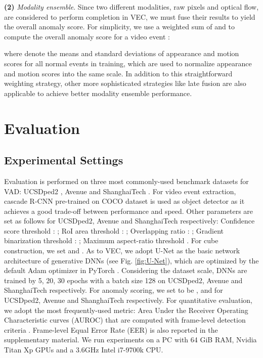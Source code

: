 \documentclass[sigconf]{acmart}
\begin{document}
\textbf{(2)} \textit{Modality ensemble}. Since two different modalities, raw pixels and optical flow, are considered to perform completion in VEC, we must fuse their results to yield the overall anomaly score. For simplicity, we use a weighted sum of  and  to compute the overall anomaly score  for a video event :


where  denote the means and standard deviations of appearance and motion scores for all normal events in training, which are used to normalize appearance and motion scores into the same scale. In addition to this straightforward weighting strategy, other more sophisticated strategies like late fusion \cite{xu2017detecting} are also applicable to achieve better modality ensemble performance.

\section{Evaluation}
\label{sec:eval}

\subsection{Experimental Settings}
Evaluation is performed on three most commonly-used benchmark datasets for VAD: UCSDped2 \cite{mahadevan2010anomaly}, Avenue \cite{lu2013abnormal} and ShanghaiTech \cite{luo2017revisit}. For video event extraction, cascade R-CNN \cite{cai2018cascade} pre-trained on COCO dataset is used as object detector as it achieves a good trade-off between performance and speed. Other parameters are set as follows for UCSDped2, Avenue and ShanghaiTech respectively: Confidence score threshold : ; RoI area threshold : ; Overlapping ratio : ; Gradient binarization threshold : ; Maximum aspect-ratio threshold . For cube construction, we set  and . As to VEC, we adopt U-Net \cite{ronneberger2015u} as the basic network architecture of generative DNNs (see Fig. \ref{fig:U-Net}), which are optimized by the default Adam optimizer in PyTorch \cite{paszke2019pytorch}. Considering the dataset scale, DNNs are trained by 5, 20, 30 epochs with a batch size 128 on UCSDped2, Avenue and ShanghaiTech respectively. For anomaly scoring, we set  to be ,  and  for UCSDped2, Avenue and ShanghaiTech respectively. For quantitative evaluation, we adopt the most frequently-used metric: Area Under the Receiver Operating Characteristic curves (AUROC) that are computed with frame-level detection criteria \cite{mahadevan2010anomaly}. Frame-level Equal Error Rate (EER) \cite{mahadevan2010anomaly} is also reported in the supplementary material. We run experiments on a PC with 64 GiB RAM, Nvidia Titan Xp GPUs and a 3.6GHz Intel i7-9700k CPU.
\end{document}
